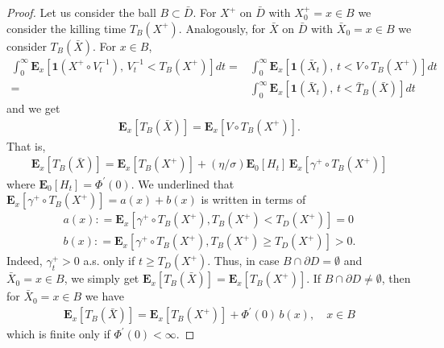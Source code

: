 \documentclass[10pt,a4paper]{amsart}
\begin{document}
\begin{proof}
Let us consider the ball $B \subset \bar{D}$. For $X^+$ on $\bar{D}$ with $X^+_0=x \in B$ we consider the killing time $T_B(X^+)$. Analogously, for $\bar{X}$ on $\bar{D}$ with $\bar{X}_0 =x \in B$ we consider $T_B(\bar{X})$. For $x \in B$,
\begin{align*}
\int_0^\infty \mathbf{E}_x[\mathbf{1}(X^+ \circ V^{-1}_t),\, V^{-1}_t < T_B(X^+)] dt = & \int_0^\infty \mathbf{E}_x[\mathbf{1}(\bar{X}_t),\, t< V \circ T_B(X^+)] dt \\ 
= & \int_0^\infty \mathbf{E}_x[\mathbf{1}(\bar{X}_t),\, t < \bar{T}_B(\bar{X})] dt
\end{align*}
and we get
\begin{align*}
\mathbf{E}_x[T_B(\bar{X})] = \mathbf{E}_x[V \circ T_B(X^+)].
\end{align*}
That is, 
\begin{align*}
\mathbf{E}_x[T_B(\bar{X})] = \mathbf{E}_x[T_B(X^+)] + (\eta/\sigma) \mathbf{E}_0[H_t]\, \mathbf{E}_x[\gamma^+ \circ T_B(X^+)]
\end{align*}
where $\mathbf{E}_0[H_t] = \Phi^\prime (0)$. We underlined that $\mathbf{E}_x[\gamma^+ \circ T_B(X^+)] = a(x) + b(x)$ is written in terms of
\begin{align*}
a(x) : = \mathbf{E}_x[\gamma^+ \circ T_B(X^+), T_B(X^+) < T_{D}(X^+)] = 0\\
b(x) : = \mathbf{E}_x[\gamma^+ \circ T_B(X^+), T_B(X^+) \geq T_{D}(X^+)] >0.
\end{align*}
Indeed, $\gamma^+_t >0$ a.s. only if $t \geq T_{D}(X^+)$. Thus, in case $B \cap \partial D = \emptyset$ and $\bar{X}_0=x \in B$, we simply get $\mathbf{E}_x[T_B(\bar{X})]= \mathbf{E}_x[T_B(X^+)]$. If $B \cap \partial D \neq \emptyset$, then for $\bar{X}_0=x \in B$ we have 
\begin{align*}
\mathbf{E}_x[T_B(\bar{X})] = \mathbf{E}_x[T_B(X^+)] + \Phi^\prime(0)\, b(x), \quad x \in B
\end{align*} 
which is finite only if $\Phi^\prime(0)< \infty$.

\end{proof}
\end{document}
